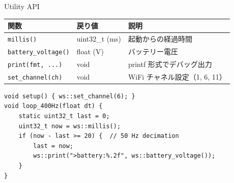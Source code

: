 \begin{frame}[fragile]{Utility API}
  \vspace{0.3em}
  {\small
  \begin{tabular}{lll}
    \hline
    \textbf{関数} & \textbf{戻り値} & \textbf{説明} \\
    \hline
    \texttt{millis()}           & uint32\_t (ms) & 起動からの経過時間 \\
    \texttt{battery\_voltage()} & float (V)      & バッテリー電圧 \\
    \texttt{print(fmt, ...)}    & void           & printf 形式でデバッグ出力 \\
    \texttt{set\_channel(ch)}   & void           & WiFi チャネル設定（1, 6, 11） \\
    \hline
  \end{tabular}
  }

  \vspace{0.3em}

  \begin{lstlisting}[style=sfcpp, basicstyle=\ttfamily\scriptsize]
void setup() { ws::set_channel(6); }
void loop_400Hz(float dt) {
    static uint32_t last = 0;
    uint32_t now = ws::millis();
    if (now - last >= 20) {  // 50 Hz decimation
        last = now;
        ws::print(">battery:%.2f", ws::battery_voltage());
    }
}
  \end{lstlisting}
\end{frame}


